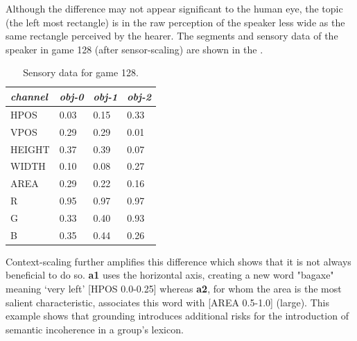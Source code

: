 Although the difference may not appear significant to 
the human eye, the topic (the left most rectangle) is 
in the raw perception of the speaker less wide as the same 
rectangle perceived by the hearer. 
The segments and sensory data of the speaker
in game 128 (after sensor-scaling) are shown in the 
. 
\begin{table}
\begin{center}
\begin{tabular}{ l  l  l  l } \midrule
{\it channel}& {\it obj-0} & {\it obj-1} & {\it obj-2}\\ \midrule
HPOS & 0.03 & 0.15 & 0.33\\ \midrule
VPOS & 0.29 & 0.29 & 0.01\\ \midrule
HEIGHT & 0.37 & 0.39 & 0.07\\ \midrule
WIDTH & 0.10 & 0.08 & 0.27\\ \midrule
AREA & 0.29 & 0.22 & 0.16\\ \midrule
R & 0.95 & 0.97 & 0.97 \\ \midrule
G & 0.33 & 0.40 & 0.93\\ \midrule
B & 0.35 & 0.44 & 0.26\\ \midrule
\end{tabular}
\caption{ \label{tab:game128} Sensory data for game 128.}
\end{center}
\end{table}
Context-scaling further
amplifies this difference which shows that it is not 
always beneficial to do so. {\bf a1} uses
the horizontal axis, creating a new word "bagaxe" 
meaning `very left' [HPOS 0.0-0.25] whereas {\bf a2}, for
whom the area is the most salient characteristic, 
associates this word with [AREA 0.5-1.0] (large). 
This example shows that grounding introduces 
additional risks for the introduction of semantic
incoherence in a group's lexicon. 

